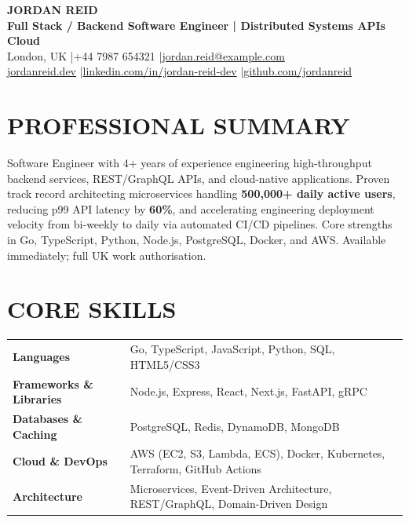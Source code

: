 \documentclass[11pt,a4paper]{article}
\begin{document}
\begin{center}
    {\Huge \textbf{JORDAN REID}} \\ \vspace{6pt}
    {\large \textbf{Full Stack / Backend Software Engineer | Distributed Systems \textbullet{} APIs \textbullet{} Cloud}} \\ \vspace{8pt}
    London, UK \quad|\quad +44 7987 654321 \quad|\quad \href{mailto:jordan.reid@example.com}{jordan.reid@example.com} \\ \vspace{4pt}
    \href{https://jordanreid.dev}{jordanreid.dev} \quad|\quad \href{https://linkedin.com/in/jordan-reid-dev}{linkedin.com/in/jordan-reid-dev} \quad|\quad \href{https://github.com/jordanreid}{github.com/jordanreid}
\end{center}

\section*{PROFESSIONAL SUMMARY}
Software Engineer with 4+ years of experience engineering high-throughput backend services, REST/GraphQL APIs, and cloud-native applications. Proven track record architecting microservices handling \textbf{500,000+ daily active users}, reducing p99 API latency by \textbf{60\%}, and accelerating engineering deployment velocity from bi-weekly to daily via automated CI/CD pipelines. Core strengths in Go, TypeScript, Python, Node.js, PostgreSQL, Docker, and AWS. Available immediately; full UK work authorisation.

\section*{CORE SKILLS}
\begin{tabularx}{\textwidth}{@{}l X@{}}
\textbf{Languages} & Go, TypeScript, JavaScript, Python, SQL, HTML5/CSS3 \\
\textbf{Frameworks \& Libraries} & Node.js, Express, React, Next.js, FastAPI, gRPC \\
\textbf{Databases \& Caching} & PostgreSQL, Redis, DynamoDB, MongoDB \\
\textbf{Cloud \& DevOps} & AWS (EC2, S3, Lambda, ECS), Docker, Kubernetes, Terraform, GitHub Actions \\
\textbf{Architecture} & Microservices, Event-Driven Architecture, REST/GraphQL, Domain-Driven Design \\
\end{tabularx}
\end{document}
